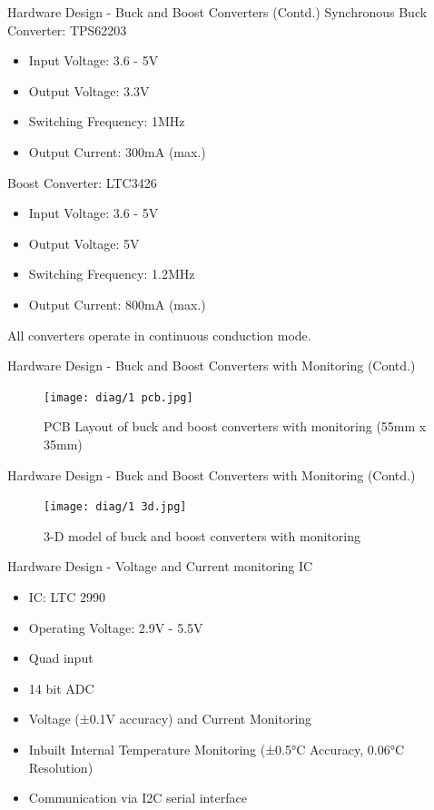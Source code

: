 \documentclass[aspectratio=169]{beamer}
\begin{document}
		\begin{frame}{Hardware Design - Buck and Boost Converters (Contd.)}
			Synchronous Buck Converter: TPS62203
			\begin{itemize}
			
				\item Input Voltage: 3.6 - 5V
				\item Output Voltage: 3.3V
				\item Switching Frequency: 1MHz
				\item Output Current: 300mA (max.)
			\end{itemize}
			Boost Converter: LTC3426
			\begin{itemize}
			
				\item Input Voltage: 3.6 - 5V
				\item Output Voltage: 5V
				\item Switching Frequency: 1.2MHz
				\item Output Current: 800mA (max.)
			\end{itemize}
			All converters operate in continuous conduction mode.
		\end{frame}
		\begin{frame}{Hardware Design - Buck and Boost Converters with Monitoring (Contd.) }
			\begin{figure}[h]
				\centering
				\texttt{[image: diag/1 pcb.jpg]}
				\caption{PCB Layout of buck and boost converters with monitoring (55mm x 35mm)}
				\label{fig:bubo}
			\end{figure}
		\end{frame}
		\begin{frame}{Hardware Design - Buck and Boost Converters with Monitoring (Contd.) }
			\begin{figure}[h]
				\centering
				\texttt{[image: diag/1 3d.jpg]}
				\caption{3-D model of buck and boost converters with monitoring}
				\label{fig:bubo}
			\end{figure}
		\end{frame}
		
		\begin{frame}{Hardware Design - Voltage and Current monitoring IC}
			
			\begin{itemize}
				\item IC: LTC 2990
				\item Operating Voltage: 2.9V - 5.5V	
				\item Quad input
				\item 14 bit ADC	
				\item Voltage (±0.1V accuracy) and Current Monitoring 
				\item Inbuilt Internal Temperature Monitoring (±0.5°C Accuracy, 0.06°C Resolution)
				\item Communication via I2C serial interface
			\end{itemize}
		\end{frame}
		
\end{document}
